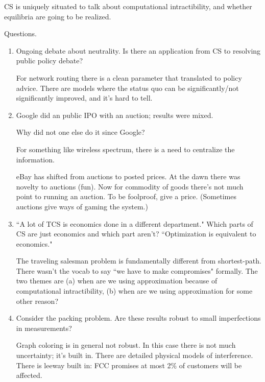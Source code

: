 CS is uniquely situated to talk about computational intractibility, and whether equilibria are going to be realized.

Questions.
\begin{enumerate}
\item
Ongoing debate about neutrality. Is there an application from CS to resolving public policy debate?

For network routing there is a clean parameter that translated to policy advice. There are models where the status quo can be significantly/not significantly improved, and it's hard to tell.
\item
Google did an public IPO with an auction; results were mixed.

Why did not one else do it since Google?

For something like wireless spectrum, there is a need to centralize the information.

eBay has shifted from auctions to posted prices. At the dawn there was novelty to auctions (fun). Now  for commodity of goods there's not much point to running an auction. To be foolproof, give a price. (Sometimes auctions give ways of gaming the system.)
\item
``A lot of TCS is economics done in a different department." Which parts of CS are just economics and which part aren't?
``Optimization is equivalent to economics."

 The traveling salesman problem is fundamentally different from shortest-path. There wasn't the vocab to say ``we have to make compromises" formally. The two themes are (a) when are we using approximation because of computational intractibility, (b) when are we using approximation for some other reason?

\item Consider the packing problem. Are these results robust to small imperfections in measurements?

 Graph coloring is  in general not robust. In this case there is not much uncertainty; it's built in. There are detailed physical models of interference. %
There is leeway built in: FCC promises at most 2\% of customers will be affected.


\end{enumerate}

